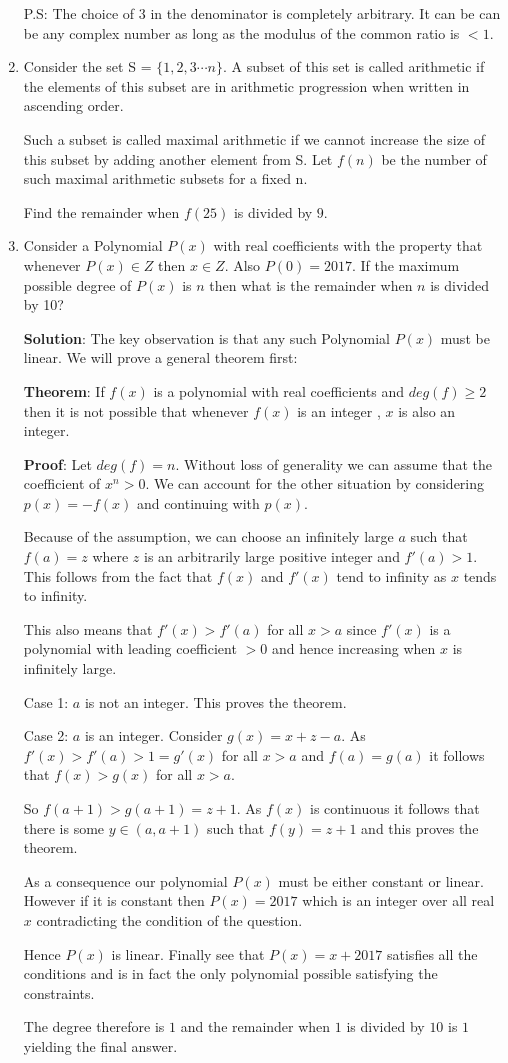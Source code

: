\documentclass[a4paper]{article}
\begin{document}
\begin{enumerate}
P.S: The choice of $3$ in the denominator is completely arbitrary. It can be can be any complex number as long as the modulus of the common ratio is $ < 1 $.

\item Consider the set S = $\lbrace{
1, 2, 3 \cdots n} \rbrace$. A subset of this set is called arithmetic if the elements of this subset are in arithmetic progression when written in ascending order. 

Such a subset is called maximal arithmetic if we cannot increase the size of this subset by adding another element from S. Let $f(n)$ be the number of such maximal arithmetic subsets for a fixed n.

Find the remainder when $f(25)$ is divided by $9$.

\item Consider a Polynomial $P(x)$ with real coefficients with the property that whenever $P(x) \in Z $ then $ x \in Z $. Also $P(0) = 2017$. If the maximum possible degree of $P(x)$ is $n$ then what is the remainder when $n$ is divided by 10?

\textbf{Solution}: The key observation is that any such Polynomial $P(x)$ must be linear. We will prove a general theorem first:

\textbf{Theorem}: If $f(x)$ is a polynomial with real coefficients and $deg(f) \geq 2$ then it is
not possible that whenever $f(x)$ is an integer , $x$ is also an integer.

\textbf{Proof}: Let $deg(f) = n$.
Without loss of generality we can assume that the coefficient of $x^n > 0$. We can account for the other situation by considering $p(x) = -f(x)$ and continuing with $p(x)$.

Because of the assumption, we can choose an infinitely large $a$ such that $f(a) = z$ where $z$ is an arbitrarily large positive integer and $f'(a) > 1$. This follows from the fact that $f(x)$ and $f'(x)$ tend to infinity as $x$ tends to infinity. 

This also means that $f'(x) > f'(a)$ for all $ x > a$ since $f'(x)$ is a polynomial with leading coefficient $ > 0$ and hence increasing when $x$ is infinitely large.

Case 1: $a$ is not an integer. This proves the theorem.

Case 2: $a$ is an integer.
Consider $g(x) = x + z - a$. As $f'(x) > f'(a) >  1 = g'(x) $ for all $x > a$ and $f(a) = g(a)$ it follows that $f(x) > g(x)$ for all $x > a$.

So $f(a+1) > g(a+1) = z + 1$.
As $f(x)$ is continuous it follows that there is some $y \in (a, a+1)$ such that $f(y) = z+1$ and this proves the theorem.

As a consequence our polynomial $P(x)$ must be either constant or linear. However if it is constant then $P(x) = 2017$ which is an integer over all real $x$ contradicting the condition of the question.

Hence $P(x)$ is linear. Finally see that $P(x) = x + 2017$ satisfies all the conditions and is in fact the only polynomial possible satisfying the constraints.

The degree therefore is $1$ and the remainder when $1$ is divided by $10$ is $1$ yielding the final answer.
\end{enumerate}
\end{document}
